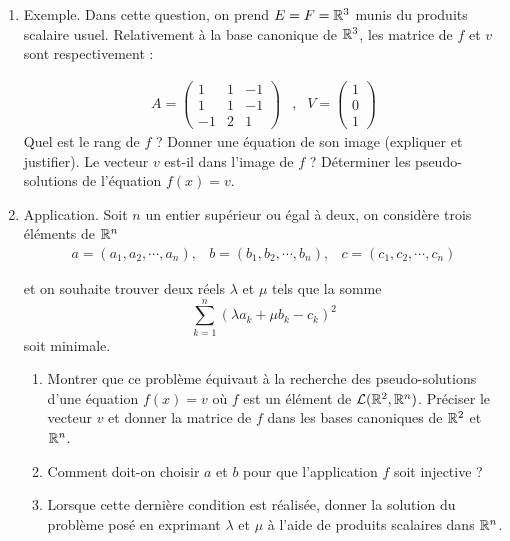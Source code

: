 \begin{enumerate}
\item Exemple. Dans cette question, on prend $E=F=\mathbb{R}^3$ munis du produits scalaire usuel. Relativement à la base canonique de $\mathbb{R}^3$, les matrice de $f$ et $v$ sont respectivement :

\begin{eqnarray*}
 A=\left( 
 \begin{array}{ccc}
   1 & 1 & -1 \\
   1 & 1 & -1 \\
   -1& 2 & 1
 \end{array}
 \right) 
 &,&
 V=\left( 
 \begin{array}{c}
   1\\0\\1
 \end{array}
 \right) 
\end{eqnarray*}
Quel est le rang de $f$ ? Donner une équation de son image (expliquer et justifier). Le vecteur $v$ est-il dans l'image de $f$ ?
Déterminer les pseudo-solutions de l'équation $f(x)=v$.

\item Application. Soit $n$ un entier supérieur ou égal à deux, on considère trois éléments de $\mathbb{R}^n$
\begin{displaymath}
\begin{array}{ccc}
  a=(a_1,a_2,\cdots,a_n),&
  b=(b_1,b_2,\cdots,b_n),&
  c=(c_1,c_2,\cdots,c_n)
\end{array}
\end{displaymath}

et on souhaite trouver deux réels $\lambda$ et $\mu$ tels que la somme
\begin{displaymath}
 \sum_{k=1}^n (\lambda a_k +\mu b_k -c_k)^2
\end{displaymath}
soit minimale.
\begin{enumerate}
 \item Montrer que ce problème équivaut à la recherche des pseudo-solutions d'une équation $ f(x)=v$ où $f$ est un élément de $\mathcal{L}(\mathbb{R}^2,\mathbb{R}^n)$. Préciser le vecteur $v$ et donner la matrice de $f$ dans les bases canoniques de $\mathbb{R}^2$ et $\mathbb{R}^n$.
 \item Comment doit-on choisir $a$ et $b$ pour que l'application $f$ soit injective ?
 \item Lorsque cette dernière condition est réalisée, donner la solution du problème posé en exprimant $\lambda$ et $\mu$ à l'aide de produits scalaires dans $\mathbb{R}^n$.
\end{enumerate}

\end{enumerate}
 
